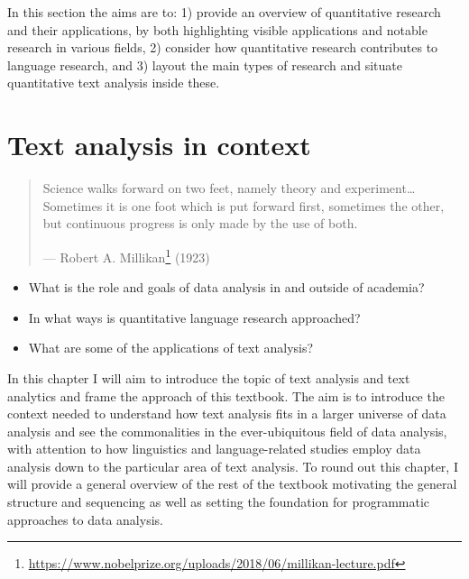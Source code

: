 \documentclass[
  letterpaper,
]{scrbook}
\providecommand{\tightlist}{%
  \setlength{\itemsep}{0pt}\setlength{\parskip}{0pt}}\usepackage{longtable,booktabs,array}
\DeclareRobustCommand{\href}[2]{#2\footnote{\url{#1}}}
\begin{document}
In this section the aims are to: 1) provide an overview of quantitative
research and their applications, by both highlighting visible
applications and notable research in various fields, 2) consider how
quantitative research contributes to language research, and 3) layout
the main types of research and situate quantitative text analysis inside
these.

\hypertarget{sec-text-analysis-in-context}{%
\chapter{Text analysis in context}\label{sec-text-analysis-in-context}}

\begin{quote}
Science walks forward on two feet, namely theory and
experiment\ldots Sometimes it is one foot which is put forward first,
sometimes the other, but continuous progress is only made by the use of
both.

---
\href{https://www.nobelprize.org/uploads/2018/06/millikan-lecture.pdf}{Robert
A. Millikan} (1923)
\end{quote}

\begin{tcolorbox}[enhanced jigsaw, title=\textcolor{quarto-callout-note-color}{\faInfo}\hspace{0.5em}{Keys}, titlerule=0mm, toptitle=1mm, colbacktitle=quarto-callout-note-color!10!white, bottomtitle=1mm, left=2mm, colframe=quarto-callout-note-color-frame, breakable, toprule=.15mm, colback=white, opacitybacktitle=0.6, leftrule=.75mm, rightrule=.15mm, bottomrule=.15mm, arc=.35mm, coltitle=black, opacityback=0]

\begin{itemize}
\tightlist
\item
  What is the role and goals of data analysis in and outside of
  academia?
\item
  In what ways is quantitative language research approached?
\item
  What are some of the applications of text analysis?
\end{itemize}

\end{tcolorbox}

In this chapter I will aim to introduce the topic of text analysis and
text analytics and frame the approach of this textbook. The aim is to
introduce the context needed to understand how text analysis fits in a
larger universe of data analysis and see the commonalities in the
ever-ubiquitous field of data analysis, with attention to how
linguistics and language-related studies employ data analysis down to
the particular area of text analysis. To round out this chapter, I will
provide a general overview of the rest of the textbook motivating the
general structure and sequencing as well as setting the foundation for
programmatic approaches to data analysis.
\end{document}
